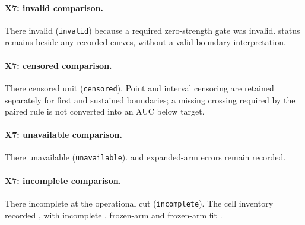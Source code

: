 \paragraph{X7: invalid comparison.}
There   invalid  (\texttt{invalid}) because a required zero-strength gate was invalid.
 status remains beside any recorded curves, without a valid boundary interpretation.

\paragraph{X7: censored comparison.}
There   censored unit  (\texttt{censored}).
Point and interval censoring are retained separately for first and sustained boundaries; a missing crossing required by the paired rule is not converted into an AUC below target.

\paragraph{X7: unavailable comparison.}
There   unavailable  (\texttt{unavailable}).  and expanded-arm errors remain recorded.

\paragraph{X7: incomplete comparison.}
There   incomplete  at the operational cut (\texttt{incomplete}).
The cell inventory recorded  , with  incomplete ,  frozen-arm  and  frozen-arm fit .

